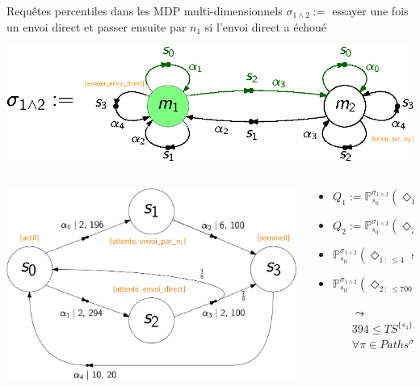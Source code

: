 \documentclass[compress]{beamer}
\begin{document}
\begin{frame}{Requêtes percentiles dans les MDP multi-dimensionnels}
  \small
      $\sigma_{1 \wedge 2} := $ essayer une fois un envoi direct et passer ensuite par $n_1$ si l'envoi direct a échoué
      \begin{center}
        \includegraphics[width=0.7\linewidth]{resources/strategy}
      \end{center}
  \begin{center}
    \begin{columns}
      \begin{column}{0.4\linewidth}
        \includegraphics[width=\linewidth]{resources/mdmdp2}
      \end{column}
      \begin{column}{0.6\linewidth}{ \footnotesize
        \begin{itemize}
          \item $Q_1 := \mathbb{P}^{\sigma_{1 \wedge 2}}_{s_0}(\Diamond_{1\, :\, \leq 4} \text{ sommeil}) \geq 0.8$
          \item $Q_2 := \mathbb{P}^{\sigma_{1 \wedge 2}}_{s_0}(\Diamond_{2\, :\, \leq 700} \text{ sommeil}) \geq 0.9$
          \item $\mathbb{P}^{\sigma_{1 \wedge 2}}_{s_0}(\Diamond_{1\, :\, \leq 4} \text{ sommeil}) = 0.875 \models Q_1$
          \item $\mathbb{P}^{\sigma_{1 \wedge 2}}_{s_0}(\Diamond_{2\, :\, \leq 700} \text{ sommeil}) = 1 \models Q_2 $
          \begin{itemize}
            \scriptsize
            \item[$\leadsto$] $394 \leq TS^{\{s_3\}}(\pi) \leq 690$ $\forall \pi \in Paths^{\sigma_{1 \wedge 2}}(s_0)$
          \end{itemize}
        \end{itemize}
        }
      \end{column}
      \end{columns}
      \end{center}
\end{frame}
\end{document}
